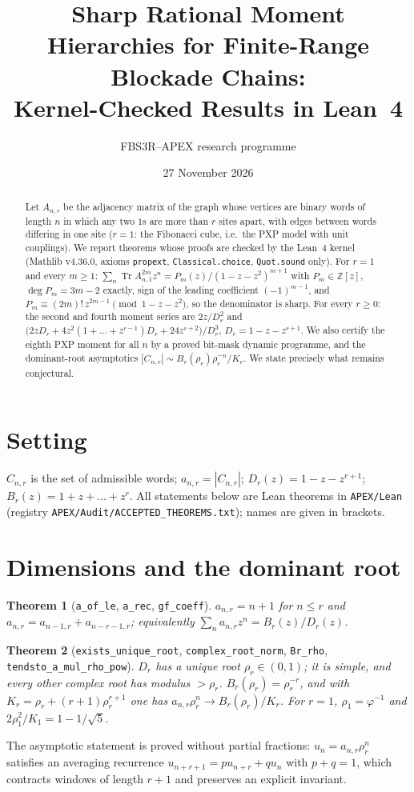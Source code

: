 \documentclass[11pt]{article}
\title{Sharp Rational Moment Hierarchies for Finite-Range Blockade Chains:\\ Kernel-Checked Results in Lean~4}
\author{FBS3R--APEX research programme}
\date{27 November 2026}
\newtheorem{theorem}{Theorem}
\theoremstyle{remark}\newtheorem{remark}[theorem]{Remark}
\begin{document}
\maketitle
\begin{abstract}
Let $A_{n,r}$ be the adjacency matrix of the graph whose vertices are binary words of length $n$ in which any two $1$s are more than $r$ sites apart, with edges between words differing in one site ($r=1$: the Fibonacci cube, i.e.\ the PXP model with unit couplings).
We report theorems whose proofs are checked by the Lean~4 kernel (Mathlib v4.36.0, axioms \texttt{propext}, \texttt{Classical.choice}, \texttt{Quot.sound} only).
For $r=1$ and every $m\ge1$: $\sum_n \operatorname{Tr}A_{n,1}^{2m}z^n=P_m(z)/(1-z-z^2)^{m+1}$ with $P_m\in\mathbb Z[z]$, $\deg P_m=3m-2$ exactly, sign of the leading coefficient $(-1)^{m-1}$, and $P_m\equiv(2m)!\,z^{2m-1}\pmod{1-z-z^2}$, so the denominator is sharp.
For every $r\ge0$: the second and fourth moment series are $2z/D_r^2$ and $\bigl(2zD_r+4z^2(1+\dots+z^{r-1})D_r+24z^{r+2}\bigr)/D_r^3$, $D_r=1-z-z^{r+1}$.
We also certify the eighth PXP moment for all $n$ by a proved bit-mask dynamic programme, and the dominant-root asymptotics $|C_{n,r}|\sim B_r(\rho_r)\rho_r^{-n}/K_r$.
We state precisely what remains conjectural.
\end{abstract}

\section{Setting}
$C_{n,r}$ is the set of admissible words; $a_{n,r}=|C_{n,r}|$; $D_r(z)=1-z-z^{r+1}$; $B_r(z)=1+z+\dots+z^r$.
All statements below are Lean theorems in \texttt{APEX/Lean} (registry \texttt{APEX/Audit/ACCEPTED\_THEOREMS.txt}); names are given in brackets.

\section{Dimensions and the dominant root}
\begin{theorem}[\texttt{a\_of\_le}, \texttt{a\_rec}, \texttt{gf\_coeff}]
$a_{n,r}=n+1$ for $n\le r$ and $a_{n,r}=a_{n-1,r}+a_{n-r-1,r}$; equivalently $\sum_n a_{n,r}z^n=B_r(z)/D_r(z)$.
\end{theorem}
\begin{theorem}[\texttt{exists\_unique\_root}, \texttt{complex\_root\_norm}, \texttt{Br\_rho}, \texttt{tendsto\_a\_mul\_rho\_pow}]
$D_r$ has a unique root $\rho_r\in(0,1)$; it is simple, and every other complex root has modulus $>\rho_r$.
$B_r(\rho_r)=\rho_r^{-r}$, and with $K_r=\rho_r+(r+1)\rho_r^{r+1}$ one has $a_{n,r}\rho_r^n\to B_r(\rho_r)/K_r$.
For $r=1$, $\rho_1=\varphi^{-1}$ and $2\rho_1^2/K_1=1-1/\sqrt5$.
\end{theorem}
The asymptotic statement is proved without partial fractions: $u_n=a_{n,r}\rho_r^n$ satisfies an averaging recurrence $u_{n+r+1}=pu_{n+r}+qu_n$ with $p+q=1$, which contracts windows of length $r+1$ and preserves an explicit invariant.
\end{document}
